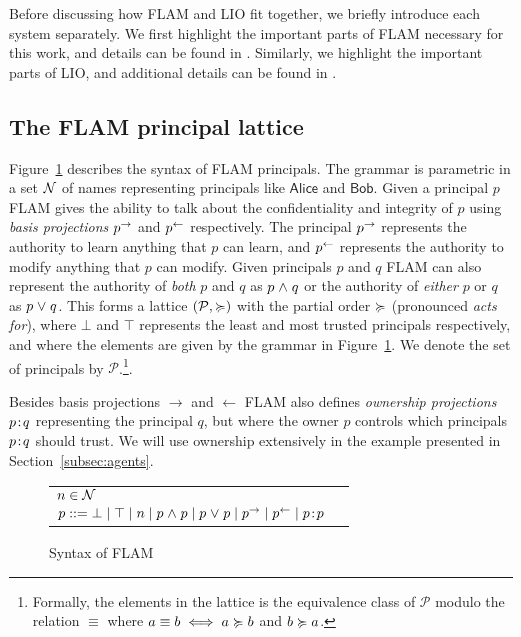 Before discussing how FLAM and LIO fit together, we briefly introduce each system separately. We first highlight the important parts of FLAM necessary for this work, and details can be found in \cite{Arden:2015:FA:2859845.2859998}. Similarly, we highlight the important parts of LIO, and additional details can be found in \cite{SRMMlio}.

\subsection{The FLAM principal lattice}
Figure~\ref{fig:flam-syntax} describes the syntax of FLAM principals. The grammar is parametric in a set $\mathcal{N}$ of names representing principals like $\mathsf{Alice}$ and $\mathsf{Bob}$. Given a principal $p$ FLAM gives the ability to talk about the confidentiality and integrity of $p$ using \emph{basis projections} $p^{\rightarrow}$ and $p^{\leftarrow}$ respectively. The principal $p^{\rightarrow}$ represents the authority to learn anything that $p$ can learn, and $p^{\leftarrow}$ represents the authority to modify anything that $p$ can modify. Given principals $p$ and $q$ FLAM can also represent the authority of \emph{both} $p$ and $q$ as $p \mathrel{\land} q$ or the authority of \emph{either} $p$ or $q$ as $p \mathrel{\lor} q$. This forms a lattice $(\mathcal{P}, \succcurlyeq)$ with the partial order $\succcurlyeq$ (pronounced \emph{acts for}), where $\bot$ and $\top$ represents the least and most trusted principals respectively, and where the elements are given by the grammar in Figure~\ref{fig:flam-syntax}. We denote the set of principals by $\mathcal{P}$.\footnote{Formally, the elements in the lattice is the equivalence class of $\mathcal{P}$ modulo the relation $\equiv$ where $a \equiv b \iff a \succcurlyeq b$ and $b \succcurlyeq a$.}.

Besides basis projections $\rightarrow$ and $\leftarrow$ FLAM also defines \emph{ownership projections} $p\!:\!q$ representing the principal $q$, but where the owner $p$ controls which principals $p\!:\!q$ should trust. We will use ownership extensively in the example presented in Section~\ref{subsec:agents}.

\begin{figure}
    \centering
    \begin{tabular}{ll}
    $n \in \mathcal{N}$ \\
    $p ::= \bot \mid \top \mid n \mid p \mathrel{\land} p \mid p \mathrel{\lor} p \mid p^{\rightarrow} \mid p^{\leftarrow} \mid p\!:\!p$
    \end{tabular}
    \caption{Syntax of FLAM}
    \label{fig:flam-syntax}
\end{figure}



